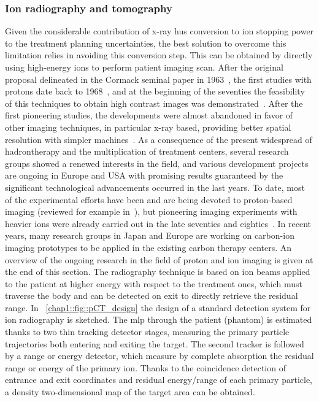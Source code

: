 \subsubsection{Ion radiography and tomography}\label{chap1::subsubsec::particleCT}

Given the considerable contribution of x-ray \glspl{hu} conversion to ion stopping power to the treatment planning uncertainties, the best solution to overcome this limitation relies in avoiding this conversion step. This can be obtained by directly using high-energy ions to perform patient imaging scan. After the original proposal delineated in the Cormack seminal paper in 1963~\parencite{Cormack1963}, the first studies with protons date back to 1968~\parencite{Koehler1968}, and at the beginning of the seventies the feasibility of this techniques to obtain high contrast images was demonstrated~\parencite{Steward1973, Cookson1974, Cormack1976}. After the first pioneering studies, the developments were almost abandoned in favor of other imaging techniques, in particular x-ray based, providing better spatial resolution with simpler machines~\parencite{Kramer1977}. As a consequence of the present widespread of hadrontherapy and the multiplication of treatment centers, several research groups showed a renewed interests in the field, and various development projects are ongoing in Europe and USA with promising results guaranteed by the significant technological advancements occurred in the last years. To date, most of the experimental efforts have been and are being devoted to proton-based imaging (reviewed for example in~\cite{Poludniowski2015, Bucciantonio2015}), but pioneering imaging experiments with heavier ions were already carried out in the late seventies and eighties~\parencite{Tobias1977, Chu1993}. In recent years, many research groups in Japan and Europe are working on carbon-ion imaging prototypes to be applied in the existing carbon therapy centers. An overview of the ongoing research in the field of proton and ion imaging is given at the end of this section.  
The radiography technique is based on ion beams applied to the patient at higher energy with respect to the treatment ones, which must traverse the body and can be detected on exit to directly retrieve the residual range. In \figurename~\ref{chap1::fig::pCT_design} the design of a standard detection system for ion radiography is sketched. The \gls{mlp} through the patient (phantom) is estimated thanks to two thin tracking detector stages, measuring the primary particle trajectories both entering and exiting the target. The second tracker is followed by a range or energy detector, which measure by complete absorption the residual range or energy of the primary ion. Thanks to the coincidence detection of entrance and exit coordinates and residual energy/range of each primary particle, a density two-dimensional map of the target area can be obtained.  


